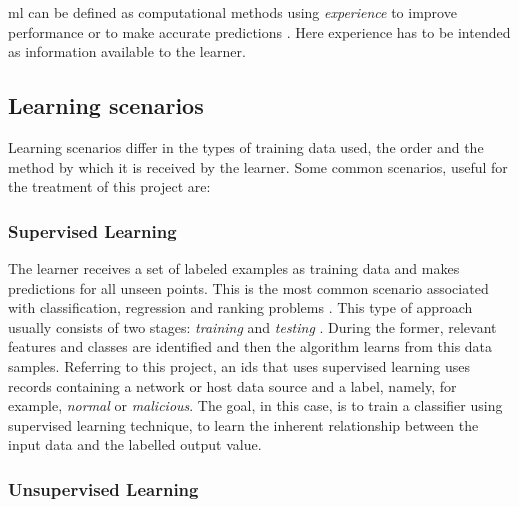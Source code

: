 
 \gls{ml} can be defined as computational methods using \textit{experience} to improve performance or to make accurate predictions \cite{Mohri2018}. Here experience has to be intended as information available to the learner.


\subsection{Learning scenarios}
\label{subsec:learning-scenarios}

Learning scenarios differ in the types of training data used, the order and the method by which it is received by the learner. Some common scenarios, useful for the treatment of this project are:


\subsubsection{Supervised Learning}
\label{subsubsec:supervised-learning}

The learner receives a set of labeled examples as training data and makes predictions for all unseen points. This is the most common scenario associated with classification, regression and ranking problems \cite[p. 6]{Mohri2018}. This type of approach usually consists of two stages: \textit{training} and \textit{testing} \cite{Khraisat2019}. During the former, relevant features and classes are identified and then the algorithm learns from this data samples. Referring to this project, an \gls{ids} that uses supervised learning uses records containing a network or host data source and a label, namely, for example, \textit{normal} or \textit{malicious}. The goal, in this case, is to train a classifier using supervised learning technique, to learn the inherent relationship between the input data and the labelled output value.


\subsubsection{Unsupervised Learning}
\label{subsubsec:unsupervised-learning}

